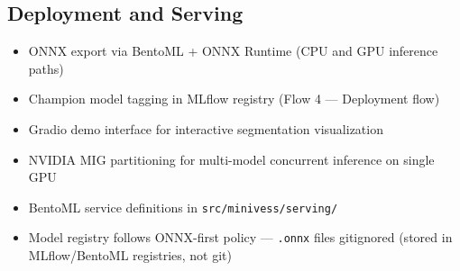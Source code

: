 
\subsection{Deployment and Serving}
\begin{itemize}
  \item ONNX export via BentoML + ONNX Runtime (CPU and GPU inference paths)
  \item Champion model tagging in MLflow registry (Flow 4 --- Deployment flow)
  \item Gradio demo interface for interactive segmentation visualization
  \item NVIDIA MIG partitioning for multi-model concurrent inference on single GPU
  \item BentoML service definitions in \texttt{src/minivess/serving/}
  \item Model registry follows ONNX-first policy --- \texttt{.onnx} files gitignored
        (stored in MLflow/BentoML registries, not git)
\end{itemize}
